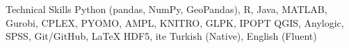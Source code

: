 \begin{rubric}{Technical Skills}
\entry*[Programming]
	Python (pandas, NumPy, GeoPandas), R, Java, MATLAB, 
\entry*[Optimization]
	Gurobi, CPLEX, PYOMO, AMPL, KNITRO, GLPK, IPOPT
	QGIS, Anylogic, SPSS, Git/GitHub, \LaTeX
\entry*[Databases]
	HDF5, ite
\entry*[Languages]
	Turkish (Native), English (Fluent)
\end{rubric}